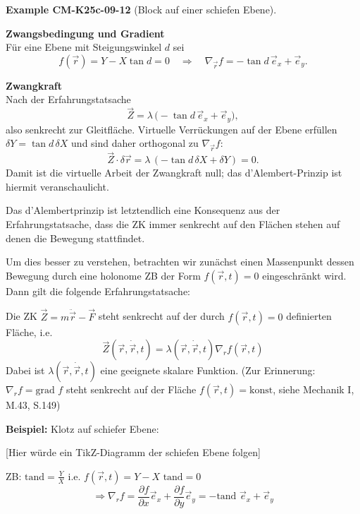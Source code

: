 \documentclass[10pt, letterpaper]{article}
\newcommand{\CustomHeading}[3]{%
  \par\medskip\noindent%
  \textbf{#1 #2} \textnormal{(#3)}.\enskip%
}
\newenvironment{EXA}[2]{\begin{unitbox}\CustomHeading{Example}{#1}{#2}}{\end{unitbox}}
\begin{document}
\begin{EXA}{CM-K25c-09-12}{Block auf einer schiefen Ebene}
\textbf{Zwangsbedingung und Gradient}\\
Für eine Ebene mit Steigungswinkel $d$ sei
\[
  f(\vec r) = Y - X\tan d = 0
  \quad\Longrightarrow\quad
  \nabla_{\!\vec r}f
  = -\tan d\,\vec e_x + \vec e_y .
\]

\textbf{Zwangkraft}\\
Nach der Erfahrungstatsache
\[
  \vec Z
  = \lambda\,\bigl(-\tan d\,\vec e_x + \vec e_y\bigr),
\]
also senkrecht zur Gleitfläche.  
Virtuelle Verrückungen auf der Ebene erfüllen
$\delta Y = \tan d\,\delta X$ und sind daher orthogonal zu
$\nabla_{\!\vec r}f$:
\[
  \vec Z\!\cdot\!\delta\vec r
  = \lambda\,(-\tan d\,\delta X + \delta Y) = 0 .
\]
Damit ist die virtuelle Arbeit der Zwangkraft null; 
das d’Alembert-Prinzip ist hiermit veranschaulicht.
\end{EXA}





Das d'Alembertprinzip ist letztendlich eine Konsequenz aus der Erfahrungstatsache, dass die ZK immer senkrecht auf den Flächen stehen auf denen die Bewegung stattfindet.

Um dies besser zu verstehen, betrachten wir zunächst einen Massenpunkt dessen Bewegung durch eine holonome ZB der Form $f(\vec{r},t)=0$ eingeschränkt wird. Dann gilt die folgende Erfahrungstatsache:

Die ZK $\vec{Z} = m\ddot{\vec{r}}-\vec{F}$ steht senkrecht auf der durch $f(\vec{r},t)=0$ definierten Fläche, i.e. 
$$\vec{Z}(\vec{r},\dot{\vec{r}},t)=\lambda(\vec{r},\dot{\vec{r}},t)\nabla_rf(\vec{r},t)$$
Dabei ist $\lambda(\vec{r},\dot{\vec{r}},t)$ eine geeignete skalare Funktion. (Zur Erinnerung: $\nabla_rf = \text{grad }f$ steht senkrecht auf der Fläche $f(\vec{r},t) = \text{konst}$, siehe Mechanik I, M.43, S.149)



\textbf{Beispiel:} Klotz auf schiefer Ebene:

[Hier würde ein TikZ-Diagramm der schiefen Ebene folgen]

ZB: $\text{tand} = \frac{Y}{X}$ i.e. $f(\vec{r},t) = Y - X\text{ tand} = 0$
$$\Rightarrow \nabla_rf = \frac{\partial f}{\partial x}\vec{e}_x + \frac{\partial f}{\partial y}\vec{e}_y = -\text{tand }\vec{e}_x+\vec{e}_y$$





\end{document}

